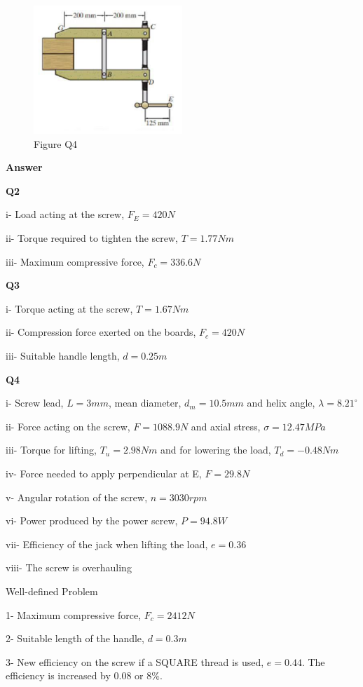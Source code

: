 \documentclass[a4paper, fleqn]{article}
\begin{document}
\begin{figure}[h]
    \centering
    \includegraphics[width=0.5\textwidth]{t2-q4.png}
    \caption{Figure Q4}
\end{figure}

\newpage

\textbf{Answer}
\vspace{10pt}

\textbf{Q2}

i- Load acting at the screw, $F_E=420N$

ii- Torque required to tighten the screw, $T=1.77Nm$

iii- Maximum compressive force, $F_c=336.6N$

\vspace{10pt}
\textbf{Q3}

i- Torque acting at the screw, $T=1.67Nm$

ii- Compression force exerted on the boards, $F_c=420N$

iii- Suitable handle length, $d=0.25m$

\vspace{10pt}
\textbf{Q4}

i- Screw lead, $L=3mm$, mean diameter, $d_m=10.5mm$ and helix angle, $\lambda=8.21^{\circ}$

ii- Force acting on the screw, $F=1088.9N$ and axial stress, $\sigma=12.47MPa$

iii- Torque for lifting, $T_u=2.98Nm$ and for lowering the load, $T_d=-0.48Nm$

iv- Force needed to apply perpendicular at E, $F=29.8N$

v- Angular rotation of the screw, $n=3030rpm$

vi- Power produced by the power screw, $P=94.8W$

vii- Efficiency of the jack when lifting the load, $e=0.36$

viii- The screw is overhauling

\vspace{10pt}
Well-defined Problem

1- Maximum compressive force, $F_c=2412N$

2- Suitable length of the handle, $d=0.3m$

3- New efficiency on the screw if a SQUARE thread is used, $e=0.44$. The efficiency is increased by 0.08 or 8\%.
\end{document}
